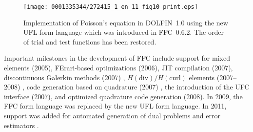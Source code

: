 \begin{figure}
\bwfig
\narrowfigure
\texttt{[image: 0001335344/272415\_1\_en\_11\_fig10\_print.eps]}
\caption{Implementation of Poisson's equation in DOLFIN~1.0 using
  the new UFL form language which was introduced in FFC~0.6.2. The
  order of trial and test functions has been restored.}
\label{fig:logg-1:poisson,ufl}
\end{figure}

Important milestones in the development of FFC include support for
mixed elements (2005), FErari-based optimizations (2006), JIT
compilation (2007), discontinuous Galerkin methods (2007)
\citep{OelgaardLoggWells2008}, $H(\mathrm{div})/H(\mathrm{curl})$
elements (2007--2008) \citep{RognesKirbyLogg2009}, code generation
based on quadrature (2007) \citep{OelgaardWells2010}, the introduction
of the UFC interface (2007), and optimized quadrature code generation
(2008). In 2009, the FFC form language was replaced by the new UFL
form language. In 2011, support was added for automated generation of
dual problems and \apost{} error estimators \citep{RognesLogg2011}.

\endgroup

